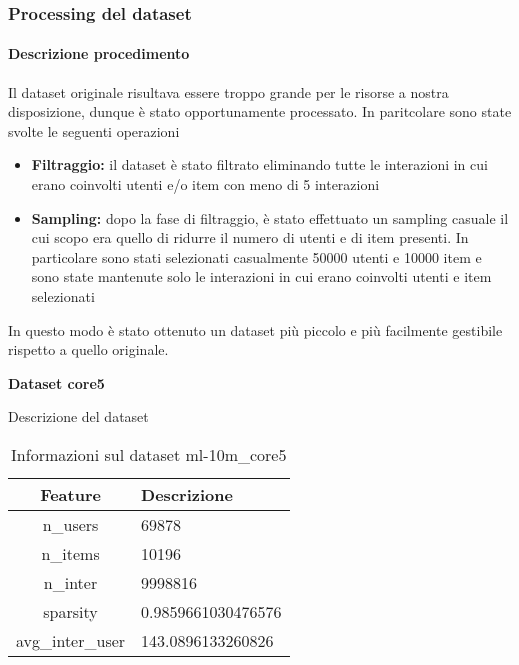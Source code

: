 \subsubsection{Processing del dataset}

\paragraph{Descrizione procedimento}


\noindent Il dataset originale risultava essere troppo grande per le risorse a nostra disposizione, dunque è stato opportunamente processato. In paritcolare sono state svolte le seguenti operazioni
\begin{itemize}
    \item \textbf{Filtraggio:} il dataset è stato filtrato eliminando tutte le interazioni in cui erano coinvolti utenti e/o item con meno di 5 interazioni
    \item \textbf{Sampling:} dopo la fase di filtraggio, è stato effettuato un sampling casuale il cui scopo era quello di ridurre il numero di utenti e di item presenti. In particolare sono stati selezionati casualmente 50000 utenti e 10000 item e sono state mantenute solo le interazioni in cui erano coinvolti utenti e item selezionati
\end{itemize}

\noindent In questo modo è stato ottenuto un dataset più piccolo e più facilmente gestibile rispetto a quello originale.

\noindent\textbf{Dataset core5}

\noindent Descrizione del dataset
\begin{table}[H]
    \centering
    \footnotesize
    \begin{tabularx}{\textwidth}{|c|X|}
        \hline
        \textbf{Feature} & \textbf{Descrizione} \\
        \hline
        n\_users & 69878 \\
        \hline
        n\_items & 10196 \\
        \hline
        n\_inter & 9998816 \\
        \hline
        sparsity & 0.9859661030476576 \\
        \hline
        avg\_inter\_user & 143.0896133260826 \\
        \hline
    \end{tabularx}
    \caption{Informazioni sul dataset ml-10m\_core5}
    \label{tab:dataset_info}
\end{table}


